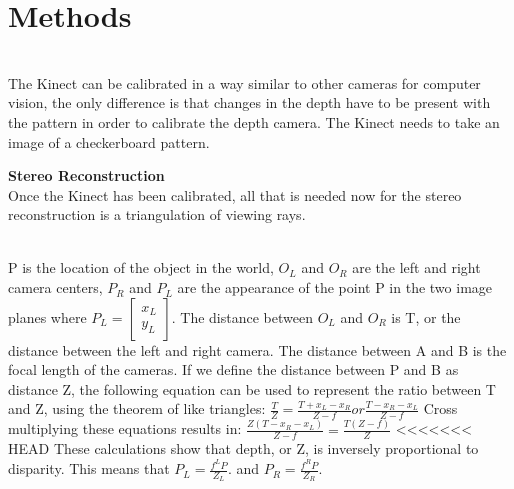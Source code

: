 \documentclass[12pt,twocolumn]{article}
\begin{document}
\section{Methods}
\\
The Kinect can be calibrated in a way similar to other cameras for computer vision, the only difference is that changes in the depth have to be present  with the pattern in order to calibrate the depth camera. The Kinect needs to take an image of a checkerboard pattern.

{ \bf Stereo Reconstruction}\\ 
Once the Kinect has been calibrated, all that is needed now for the stereo reconstruction is a triangulation of viewing rays. \\
 \\
\indent P is the location of the object in the world, $O_{L}$ and $O_{R}$ are the left and right camera centers, $P_{R}$ and $P_{L}$ are the appearance of the point P in the two image planes where $P_{L}= \begin{bmatrix}
x_{L} \\
y_{L} \end{bmatrix} $. The distance between $O_{L}$ and $O_{R}$ is T, or the distance between the left and right camera. The distance between A and B is the focal length of the cameras. If we define the distance between P and B as distance Z, the following equation  can be used to represent the ratio between T and Z, using the theorem of like triangles: 
$\frac{T}{Z}=\frac{T+x_{L}-x_{R}}{Z-f} or \frac{T-{x_{R}-x_{L}}}{Z-f} $ 
Cross multiplying these equations results in: 
$\frac{Z(T-x_{R}-x_{L})}{Z-f} = \frac{T(Z-f)}{Z} $ 
<<<<<<< HEAD
These calculations show that depth, or Z, is inversely proportional to disparity. This means that  $P_{L}= \frac{f^{L}P}{Z_{L}}. $ and $P_{R}= \frac{f^{R}P}{Z_{R}}. $ \\ \\
\end{document}
